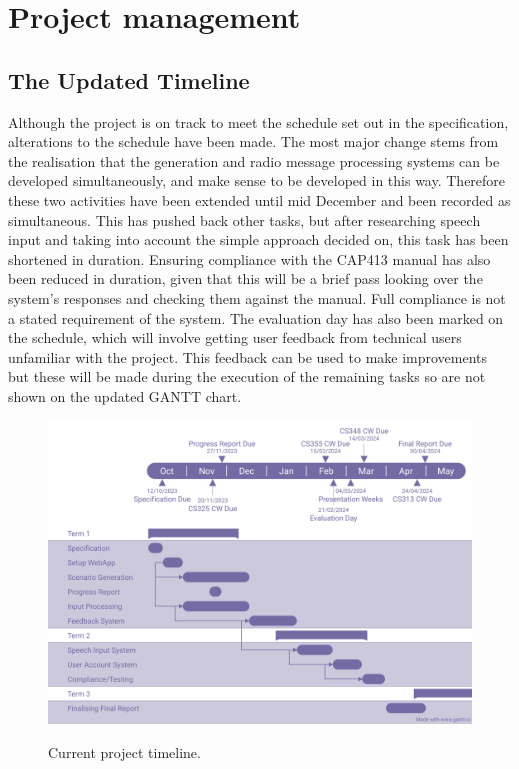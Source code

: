 \section{Project management}


\subsection{The Updated Timeline}
Although the project is on track to meet the schedule set out in the specification, alterations to the schedule have been made. The most major change stems from the realisation that the generation and radio message processing systems can be developed simultaneously, and make sense to be developed in this way. Therefore these two activities have been extended until mid December and been recorded as simultaneous. This has pushed back other tasks, but after researching speech input and taking into account the simple approach decided on, this task has been shortened in duration. Ensuring compliance with the CAP413 manual has also been reduced in duration, given that this will be a brief pass looking over the system's responses and checking them against the manual. Full compliance is not a stated requirement of the system. The evaluation day has also been marked on the schedule, which will involve getting user feedback from technical users unfamiliar with the project. This feedback can be used to make improvements but these will be made during the execution of the remaining tasks so are not shown on the updated GANTT chart.

\begin{figure}[H]
    \centering
	\includegraphics[scale = 0.3]{../document-resources/images/second-gantt}
    \label{progress-report-gantt}
    \caption{Current project timeline.}
\end{figure}

